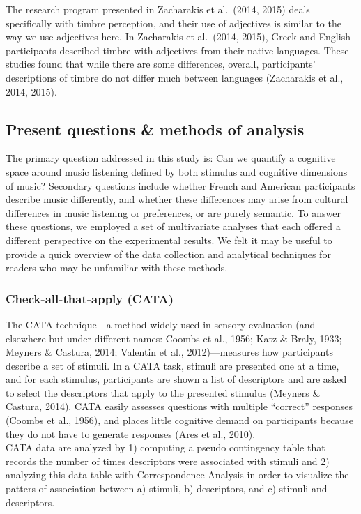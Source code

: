 \documentclass[
  english,
  man]{apa6}
\begin{document}
The research program presented in Zacharakis et al.~(2014, 2015) deals specifically with timbre perception, and their use of adjectives is similar to the way we use adjectives here. In Zacharakis et al.~(2014, 2015), Greek and English participants described timbre with adjectives from their native languages. These studies found that while there are some differences, overall, participants' descriptions of timbre do not differ much between languages (Zacharakis et al., 2014, 2015).

\hypertarget{present-questions-methods-of-analysis}{%
\subsection{Present questions \& methods of analysis}\label{present-questions-methods-of-analysis}}

The primary question addressed in this study is: Can we quantify a cognitive space around music listening defined by both stimulus and cognitive dimensions of music? Secondary questions include whether French and American participants describe music differently, and whether these differences may arise from cultural differences in music listening or preferences, or are purely semantic. To answer these questions, we employed a set of multivariate analyses that each offered a different perspective on the experimental results. We felt it may be useful to provide a quick overview of the data collection and analytical techniques for readers who may be unfamiliar with these methods.

\hypertarget{check-all-that-apply-cata}{%
\subsubsection{Check-all-that-apply (CATA)}\label{check-all-that-apply-cata}}

The CATA technique---a method widely used in sensory evaluation (and elsewhere but under different names: Coombs et al., 1956; Katz \& Braly, 1933; Meyners \& Castura, 2014; Valentin et al., 2012)---measures how participants describe a set of stimuli. In a CATA task, stimuli are presented one at a time, and for each stimulus, participants are shown a list of descriptors and are asked to select the descriptors that apply to the presented stimulus (Meyners \& Castura, 2014). CATA easily assesses questions with multiple ``correct'' responses (Coombs et al., 1956), and places little cognitive demand on participants because they do not have to generate responses (Ares et al., 2010).\\
CATA data are analyzed by 1) computing a pseudo contingency table that records the number of times descriptors were associated with stimuli and 2) analyzing this data table with Correspondence Analysis in order to visualize the patters of association between a) stimuli, b) descriptors, and c) stimuli and descriptors.
\end{document}
